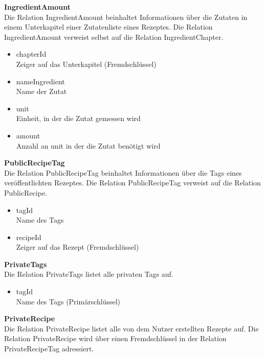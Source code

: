 \textbf{IngredientAmount}\\
Die Relation IngredientAmount beinhaltet Informationen über die Zutaten in einem Unterkapitel einer Zutatenliste eines Rezeptes. Die Relation IngredientAmount verweist selbst auf die Relation IngredientChapter.

\begin{itemize}
	\item chapterId \\ Zeiger auf das Unterkapitel (Fremdschlüssel)
	\item nameIngredient \\ Name der Zutat
	\item unit \\ Einheit, in der die Zutat gemessen wird
	\item amount \\ Anzahl an unit in der die Zutat benötigt wird
\end{itemize}

\textbf{PublicRecipeTag}\\
Die Relation PublicRecipeTag beinhaltet Informationen über die Tags eines veröffentlichten Rezeptes. Die Relation PublicRecipeTag verweist auf die Relation PublicRecipe.

\begin{itemize}
	\item tagId \\ Name des Tags
	\item recipeId \\ Zeiger auf das Rezept (Fremdschlüssel)
\end{itemize}

\textbf{PrivateTags}\\
Die Relation PrivateTags listet alle privaten Tags auf.

\begin{itemize}
	\item tagId \\ Name des Tags (Primärschlüssel)
\end{itemize}

\textbf{PrivateRecipe}\\
Die Relation PrivateRecipe listet alle von dem Nutzer erstellten Rezepte auf. Die Relation PrivateRecipe wird über einen Fremdschlüssel in der Relation PrivateRecipeTag adressiert.


